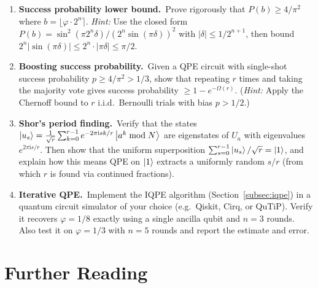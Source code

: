 \documentclass[12pt,a4paper]{article}
\newcommand{\QPE}{\textsc{QPE}}
\newcommand{\ii}{\mathrm{i}}
\begin{document}
\begin{enumerate}[label=\textbf{C\arabic*.}, leftmargin=*]
  \item \textbf{Success probability lower bound.}\ Prove rigorously that
        $P(b) \geq 4/\pi^2$ where $b = \lfloor \varphi\cdot 2^n \rceil$.
        \emph{Hint:} Use the closed form
        $P(b) = \sin^2(\pi 2^n \delta)/(2^n \sin(\pi\delta))^2$
        with $|\delta| \leq 1/2^{n+1}$, then bound
        $2^n|\sin(\pi\delta)| \leq 2^n\cdot |\pi\delta| \leq \pi/2$.

  \item \textbf{Boosting success probability.}\ Given a \QPE{} circuit with
        single-shot success probability $p \geq 4/\pi^2 > 1/3$, show that
        repeating $r$ times and taking the majority vote gives success
        probability $\geq 1 - e^{-\Omega(r)}$.
        (\emph{Hint:} Apply the Chernoff bound to $r$ i.i.d.\ Bernoulli trials
        with bias $p > 1/2$.)

  \item \textbf{Shor's period finding.}\ Verify that the states
        $\Ket{u_s} = \frac{1}{\sqrt{r}}\sum_{k=0}^{r-1}e^{-2\pi\ii sk/r}\Ket{a^k\bmod N}$
        are eigenstates of $U_a$ with eigenvalues $e^{2\pi\ii s/r}$.
        Then show that the uniform superposition
        $\sum_{s=0}^{r-1}\Ket{u_s}/\sqrt{r} = \Ket{1}$,
        and explain how this means \QPE{} on $\Ket{1}$ extracts a
        uniformly random $s/r$ (from which $r$ is found via continued fractions).

  \item \textbf{Iterative QPE.}\ Implement the IQPE algorithm
        (Section~\ref{subsec:iqpe}) in a quantum circuit simulator of your
        choice (e.g.\ Qiskit, Cirq, or QuTiP).  Verify it recovers
        $\varphi = 1/8$ exactly using a single ancilla qubit and $n=3$ rounds.
        Also test it on $\varphi = 1/3$ with $n=5$ rounds and report the
        estimate and error.
\end{enumerate}

\newpage

\section{Further Reading}
\label{sec:reading}
\end{document}
